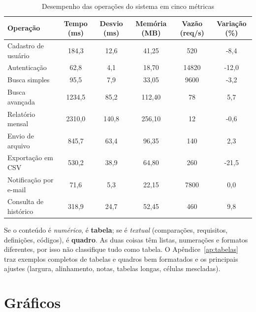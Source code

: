 \begin{table}[htbp]
\begin{tabela}[\linewidth]{\caption{Desempenho das operações do sistema em cinco métricas}\label{tab:exemplo}}{\elaboracaopropria{}}
  \begin{tabular*}{\linewidth}{@{\extracolsep{\fill}} l S[table-format=4.1] S[table-format=3.1] S[table-format=3.2] S[table-format=5.0] S[table-format=-2.1]}
    \toprule
    \textbf{Operação} & {\textbf{Tempo (ms)}} & {\textbf{Desvio (ms)}} & {\textbf{Memória (MB)}} & {\textbf{Vazão (req/s)}} & {\textbf{Variação (\%)}} \\
    \midrule
    Cadastro de usuário  &  184,3 &  12,6 &  41,25 &   520 &  -8,4 \\
    Autenticação         &   62,8 &   4,1 &  18,70 & 14820 & -12,0 \\
    Busca simples        &   95,5 &   7,9 &  33,05 &  9600 &  -3,2 \\
    Busca avançada       & 1234,5 &  85,2 & 112,40 &    78 &   5,7 \\
    Relatório mensal     & 2310,0 & 140,8 & 256,10 &    12 &  -0,6 \\
    Envio de arquivo     &  845,7 &  63,4 &  96,35 &   140 &   2,3 \\
    Exportação em CSV    &  530,2 &  38,9 &  64,80 &   260 & -21,5 \\
    Notificação por e-mail & 71,6 &   5,3 &  22,15 &  7800 &   0,0 \\
    Consulta de histórico &  318,9 & 24,7 &  52,45 &   460 &   9,8 \\
    \bottomrule
  \end{tabular*}
\end{tabela}
\end{table}

\begin{dica}
Se o conteúdo é \emph{numérico}, é \textbf{tabela}; se é \emph{textual}
(comparações, requisitos, definições, códigos), é \textbf{quadro}. As duas coisas têm
listas, numerações e formatos diferentes, por isso não classifique tudo como tabela. O
Apêndice~\ref{ap:tabelas} traz exemplos completos de tabelas e quadros bem formatados
e os principais ajustes (largura, alinhamento, notas, tabelas longas, células mescladas).
\end{dica}

\section{Gráficos}

